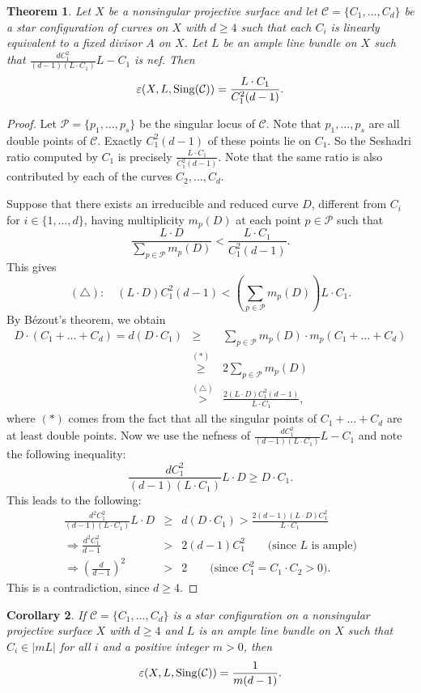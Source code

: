 \documentclass[12pt,reqno]{amsart}
\theoremstyle{plain}
\numberwithin{equation}{section}
\newtheorem{theorem}{Theorem}[section]
\newtheorem{corollary}[theorem]{Corollary}
\theoremstyle{definition}
\begin{document}
	
	\begin{theorem}
		\label{prop:star} Let $X$ be a nonsingular projective surface and let $\mathcal{C} = \{C_{1}, \ldots, C_{d}\}$ be a star configuration of curves on $X$ with $d \geq 4$ such that each $ C_i$ is linearly equivalent to a fixed divisor $A$ on $X$. Let $L$ be an ample line bundle on $X$
		such that  $\frac{dC_1^2}{(d-1)(L\cdot C_1)}L-C_1$ is nef.   Then 
		$$\varepsilon(X, L,{\rm Sing}(\mathcal{C})) = \frac{L\cdot C_1}{C_1^2(d-1)}.$$
	\end{theorem}
	\begin{proof}
	 Let $\mathcal{P} = \{p_{1}, \ldots, p_{s}\}$ be the singular locus of  $\mathcal{C}$. Note that $p_{1}, \ldots, p_{s}$ are all double points of 
	  $\mathcal{C}$. Exactly $C_1^2(d-1)$ of these points lie on $C_1$. So the Seshadri ratio computed by $C_1$ is precisely 
	  $ \frac{L\cdot C_1}{C_1^2(d-1)}$. Note that the same ratio is also contributed by each of the curves $C_2,\ldots, C_d$. 
	 
	 
	 Suppose that there exists an irreducible and reduced curve $D$, different from $C_{i}$ for $i \in \{1,\ldots, d\}$, having multiplicity $m_{p}(D)$ at each point $p \in \mathcal{P}$ such that
		$$\frac{L \cdot D}{\sum_{p \in \mathcal{P}} m_{p}(D)} < \frac{L\cdot C_1}{C_1^2(d-1)}.$$
This gives
		$$(\triangle) : \quad (L \cdot D)C_1^2(d-1) < \left(\sum_{p \in \mathcal{P}} m_{p}(D)\right)L\cdot C_1.$$
		By B\'ezout's theorem, we obtain
		\begin{eqnarray*}
		D\cdot (C_{1}+ \ldots + C_{d})=d(D\cdot C_1) &\geq& \sum_{p \in \mathcal{P}}m_{p}(D)\cdot m_{p}(C_{1}+ \ldots + C_{d})\\
		&\stackrel{(*)}{\geq}& 2\sum_{p \in \mathcal{P}} m_{p}(D) \\
		&\stackrel{(\triangle)}{>}& \frac{2(L \cdot D)C_1^2(d-1)}{L\cdot C_1},
		\end{eqnarray*}
		where $(*)$ comes from the fact that all the singular points of $C_{1}+ \ldots + C_{d}$ are at least double points. Now we use the nefness 
		of $\frac{dC_1^2}{(d-1)(L\cdot C_1)}L-C_1$ and note the following  inequality: 
		\[
		\frac{dC_1^2}{(d-1)(L\cdot C_1)}L\cdot D \geq D\cdot C_1.
		\] 
		This leads to the following:
		\begin{eqnarray*}
			\frac{d^2C_1^2}{(d-1)(L\cdot C_1)}L\cdot D &\geq& d (D\cdot C_1) > \frac{2(d-1)(L\cdot D)C_1^2}{L\cdot C_1} \\
			\Rightarrow \frac{d^2C_1^2}{d-1} &>& 2(d-1)C_1^2 \quad \quad \text{(since $L$ is ample)} \\
			\Rightarrow \left(\frac{d}{d-1} \right)^2 &>& 2 \quad \quad \text{(since $C_1^2 = C_1\cdot C_2 > 0$)}.
		\end{eqnarray*}
		This is a contradiction, since $d\geq 4$.
	\end{proof}
	\begin{corollary}
		\label{coro:star}
		If $\mathcal{C} = \{C_{1}, \ldots, C_{d}\}$ is a star configuration on a nonsingular projective surface $X$ with $d \geq 4$  and $L$ is an ample line bundle  on $X$ such that $ C_i \in |mL|$ for all $i$ and a positive integer $m>0$, then 
		$$\varepsilon(X, L,{\rm Sing}(\mathcal{C})) = \frac{1}{m(d-1)}.$$
	\end{corollary}
\end{document}
